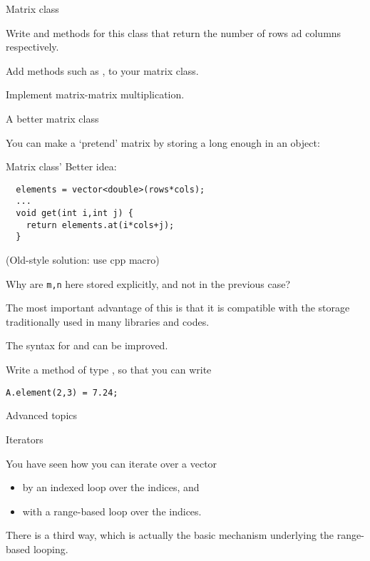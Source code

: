 \begin{block}{Matrix class}
  \label{sl:matrix-class}
\end{block}

\begin{exercise}
  \label{ex:matrixclass-rowcol1}
  Write  and  methods for this class that return
  the number of rows ad columns respectively.
\end{exercise}

\begin{exercise}
  \label{ex:matrix-methods}
  Add methods such as ,  to your matrix class.

  Implement matrix-matrix multiplication.
\end{exercise}

 {A better matrix class}

You can make a `pretend' matrix by storing a long enough  in
an object:
%

\begin{slide}{Matrix class'}
  \label{sl:matrix-class-cont}
  Better idea:
\begin{lstlisting}
  elements = vector<double>(rows*cols);
  ...
  void get(int i,int j) {
    return elements.at(i*cols+j);
  }
\end{lstlisting}
(Old-style solution: use cpp macro)
\end{slide}

\begin{exercise}
  \label{ex:matrixclass-rowcol2}
  Why are \lstinline{m,n} here stored explicitly, and not in the
  previous case?
\end{exercise}

The most important advantage of this is that it is compatible with
the storage traditionally used in 
many libraries and codes.

The syntax for  and  can be improved.
\begin{exercise}
  Write a method  of type , so that you can write
\begin{lstlisting}
A.element(2,3) = 7.24;
\end{lstlisting}
\end{exercise}

 {Advanced topics}

 {Iterators}
\label{sec:iterator}

You have seen how you can iterate over a vector
\begin{itemize}
\item by an indexed loop over the indices, and
\item with a range-based loop over the indices.
\end{itemize}
There is a third way, which is actually the basic mechanism underlying
the range-based looping.

